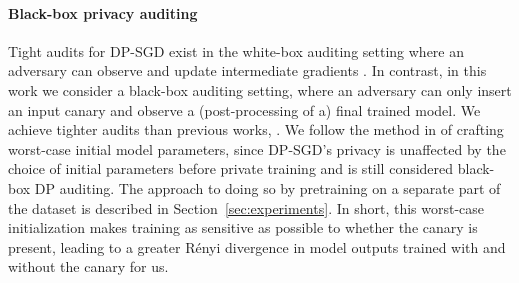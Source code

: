 \documentclass{article}
\theoremstyle{plain}
\theoremstyle{definition}
\theoremstyle{remark}
\begin{document}
\paragraph{Black-box privacy auditing}
Tight audits for DP-SGD exist in the white-box auditing setting where an adversary can observe and update intermediate gradients \cite{nasr2023tight}. In contrast, in this work we consider a black-box auditing setting, where an adversary can only insert an input canary and observe a (post-processing of a)
final trained model. We achieve tighter audits than previous works, \cite{jagielski2020auditing, nasr2023tight, steinke2023privacy, muthu2024nearly}. We follow
the method in \cite{muthu2024nearly} of crafting worst-case initial model parameters, since DP-SGD's privacy is unaffected by the choice of initial parameters before private training and is still considered black-box DP auditing. The approach to doing so by pretraining on a separate part of the dataset is described in Section~\ref{sec:experiments}. In short, this worst-case initialization makes training as sensitive as possible to whether the canary is present, leading to a greater R\'enyi divergence in model outputs trained with and without the canary for us.
\end{document}
